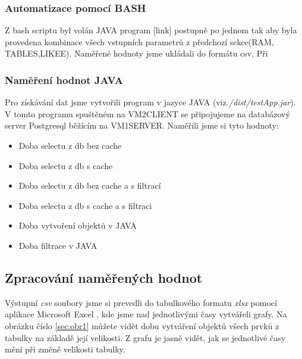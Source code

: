 \documentclass[a4paper, 11pt]{article}
\begin{document}
\subsubsection{Automatizace pomocí BASH}
Z bash scriptu byl volán JAVA program [link] postupně po jednom tak aby byla provedena kombinace všech vstupních parametrů z předchozí sekce(RAM, TABLES,LIKEE). Naměřené hodnoty jsme ukládali do formátu csv. Při 
\subsubsection{Naměření hodnot JAVA}
Pro získávání dat jsme vytvořili program v jazyce JAVA (viz.\textit{/dist/testApp.jar}). V tomto programu spuštěném na VM2CLIENT se připojujeme na databázový server Postgresql běžícím na VM1SERVER. Naměřili jsme si tyto hodnoty:

\begin{itemize}
\item Doba selectu z db bez cache
\item Doba selectu z db s cache
\item Doba selectu z db bez cache a s filtrací
\item Doba selectu z db s cache a s filtraci
\item Doba vytvoření objektů v JAVA
\item Doba filtrace v JAVA

\end{itemize}
 
\subsection{Zpracování naměřených hodnot} \label{zprachodnot}
Výstupní \textit{csv} soubory jsme si prevedli do tabulkového formatu \textit{xlsx} pomocí aplikace Microsoft Excel \cite{excel}, kde jsme nad jednotlivými časy vytvářeli grafy. Na obrázku číslo \ref{sec:obr1} můžete vidět dobu vytváření objektů všech prvků z tabulky na základě její velikosti. Z grafu je jasně vidět, jak se jednotlivé časy mění při změně velikosti tabulky. 
\end{document}
